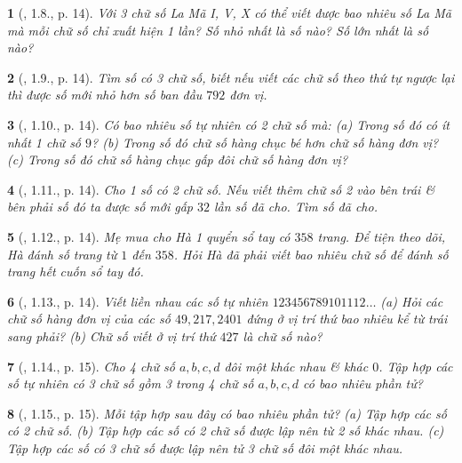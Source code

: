 \documentclass{article}
\newtheorem{baitoan}{}
\begin{document}
\begin{baitoan}[\cite{Binh_boi_duong_Toan_6_tap_1}, 1.8., p. 14]
	Với 3 chữ số La Mã I, V, X có thể viết được bao nhiêu số La Mã mà mỗi chữ số chỉ xuất hiện 1 lần? Số nhỏ nhất là số nào? Số lớn nhất là số nào?
\end{baitoan}

\begin{baitoan}[\cite{Binh_boi_duong_Toan_6_tap_1}, 1.9., p. 14]
	Tìm số có 3 chữ số, biết nếu viết các chữ số theo thứ tự ngược lại thì được số mới nhỏ hơn số ban đầu $792$ đơn vị.
\end{baitoan}

\begin{baitoan}[\cite{Binh_boi_duong_Toan_6_tap_1}, 1.10., p. 14]
	Có bao nhiêu số tự nhiên có 2 chữ số mà: (a) Trong số đó có ít nhất 1 chữ số $9$? (b) Trong số đó chữ số hàng chục bé hơn chữ số hàng đơn vị? (c) Trong số đó chữ số hàng chục gấp đôi chữ số hàng đơn vị?
\end{baitoan}

\begin{baitoan}[\cite{Binh_boi_duong_Toan_6_tap_1}, 1.11., p. 14]
	Cho 1 số có 2 chữ số. Nếu viết thêm chữ số 2 vào bên trái \& bên phải số đó ta được số mới gấp $32$ lần số đã cho. Tìm số đã cho.
\end{baitoan}

\begin{baitoan}[\cite{Binh_boi_duong_Toan_6_tap_1}, 1.12., p. 14]
	Mẹ mua cho Hà 1 quyển sổ tay có $358$ trang. Để tiện theo dõi, Hà đánh số trang từ $1$ đến $358$. Hỏi Hà đã phải viết bao nhiêu chữ số để đánh số trang hết cuốn sổ tay đó.
\end{baitoan}

\begin{baitoan}[\cite{Binh_boi_duong_Toan_6_tap_1}, 1.13., p. 14]
	Viết liền nhau các số tự nhiên $123456789101112\ldots$ (a) Hỏi các chữ số hàng đơn vị của các số $49,217,2401$ đứng ở vị trí thứ bao nhiêu kể từ trái sang phải? (b) Chữ số viết ở vị trí thứ $427$ là chữ số nào?
\end{baitoan}

\begin{baitoan}[\cite{Binh_boi_duong_Toan_6_tap_1}, 1.14., p. 15]
	Cho 4 chữ số $a,b,c,d$ đôi một khác nhau \& khác $0$. Tập hợp các số tự nhiên có 3 chữ số gồm 3 trong 4 chữ số $a,b,c,d$ có bao nhiêu phần tử?
\end{baitoan}

\begin{baitoan}[\cite{Binh_boi_duong_Toan_6_tap_1}, 1.15., p. 15]
	Mỗi tập hợp sau đây có bao nhiêu phần tử? (a) Tập hợp các số có 2 chữ số. (b) Tập hợp các số có 2 chữ số được lập nên từ 2 số khác nhau. (c) Tập hợp các số có 3 chữ số được lập nên tử 3 chữ số đôi một khác nhau.
\end{baitoan}
\end{document}
